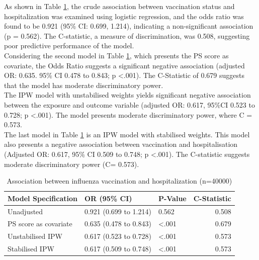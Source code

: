 \documentclass[
]{article}
\begin{document}
As shown in Table \ref{tab:res}, the crude association between vaccination status and hospitalization was examined using logistic regression, and the odds ratio was found to be 0.921 (95\% CI: 0.699, 1.214), indicating a non-significant association (p = 0.562). The C-statistic, a measure of discrimination, was 0.508, suggesting poor predictive performance of the model.\\
\hspace*{0.333em}\hspace*{0.333em}\hspace*{0.333em}\hspace*{0.333em}Considering the second model in Table \ref{tab:res}, which presents the PS score as covariate, the Odds Ratio suggests a significant negative association (adjusted OR: 0.635. 95\% CI 0.478 to 0.843; p \textless.001). The C-Statistic of 0.679 suggests that the model has moderate discriminatory power.\\
\hspace*{0.333em}\hspace*{0.333em}\hspace*{0.333em}\hspace*{0.333em}The IPW model with unstabilised weights yields significant negative association between the exposure and outcome variable (adjusted OR: 0.617, 95\%CI 0.523 to 0.728; p \textless.001). The model presents moderate discriminatory power, where C = 0.573.\\
\hspace*{0.333em}\hspace*{0.333em}\hspace*{0.333em}\hspace*{0.333em}The last model in Table \ref{tab:res} is an IPW model with stabilised weights. This model also presents a negative association between vaccination and hospitalisation (Adjusted OR: 0.617, 95\% CI 0.509 to 0.748; p \textless.001). The C-statistic suggests moderate discriminatory power (C= 0.573).

\begin{table}[!h]

\caption{\label{tab:res}Association between influenza vaccination and hospitalization (n=40000)}
\centering
\begin{tabular}[t]{lllr}
\toprule
Model Specification & OR (95\% CI) & P-Value & C-Statistic\\
\midrule
Unadjusted & 0.921 (0.699 to 1.214) & 0.562 & 0.508\\
PS score as covariate & 0.635 (0.478 to 0.843) & <.001 & 0.679\\
Unstabilised IPW & 0.617 (0.523 to 0.728) & <.001 & 0.573\\
Stabilised IPW & 0.617 (0.509 to 0.748) & <.001 & 0.573\\
\bottomrule
\end{tabular}
\end{table}
\end{document}

